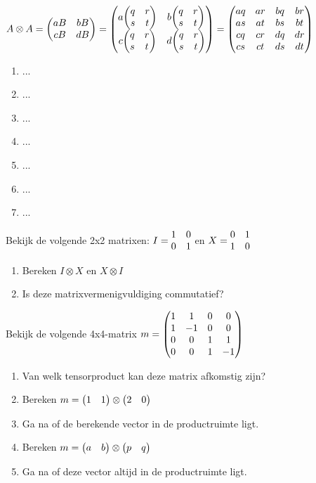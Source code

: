 \documentclass[../main.tex]{subfiles}
\begin{document}
\begin{mdframed}[style=wiskader,frametitle={Matrixen}]
$\matr{A} \otimes \matr{A} = \mqty(a\matr{B} & b\matr{B} \\ c\matr{B}&d\matr{B}) = \mqty(a\mqty(q&r \\ s & t) & b\mqty(q&r \\ s & t) \\ c\mqty(q&r \\ s & t) & d\mqty(q&r \\ s & t)) = \mqty(aq &ar & bq &br \\as &at & bs &bt \\ cq &cr &dq &dr\\cs&ct&ds&dt)$

\begin{antwoord}
\begin{enumerate}
\item $...$
\item $...$
\item $...$
\item $...$
\item $...$
\item $...$
\item $...$
\end{enumerate}
\end{antwoord}
\begin{opdracht}
Bekijk de volgende 2x2 matrixen: $I=\mqty{1&0\\0&1}$ en $X=\mqty{0&1\\1&0}$
\begin{enumerate}
\item Bereken $I \otimes X$ en $X \otimes I$
\item Is deze matrixvermenigvuldiging commutatief?
\end{enumerate}
Bekijk de volgende 4x4-matrix $m = \mqty(1 &1 & 0 &0 \\1 &-1 & 0 &0 \\0  &0 &1  &1 \\0 &0 &1 &-1)$
\begin{enumerate}
\item Van welk tensorproduct kan deze matrix afkomstig zijn?
\item Bereken $m=\mqty(1&1) \otimes \mqty(2&0)$
\item Ga na of de berekende vector in de productruimte ligt.
\item Bereken $m=\mqty(a&b) \otimes \mqty(p&q)$
\item Ga na of deze vector altijd in de productruimte ligt.
\end{enumerate}
\end{opdracht}


\end{mdframed}
\end{document}
